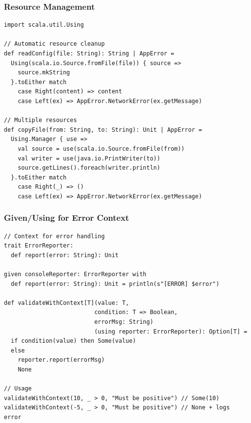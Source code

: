 \documentclass{beamer}
\begin{document}
\begin{frame}[fragile]
\frametitle{Resource Management}

\begin{lstlisting}[style=scalaStyle]
import scala.util.Using

// Automatic resource cleanup
def readConfig(file: String): String | AppError = 
  Using(scala.io.Source.fromFile(file)) { source =>
    source.mkString
  }.toEither match
    case Right(content) => content
    case Left(ex) => AppError.NetworkError(ex.getMessage)

// Multiple resources
def copyFile(from: String, to: String): Unit | AppError = 
  Using.Manager { use =>
    val source = use(scala.io.Source.fromFile(from))
    val writer = use(java.io.PrintWriter(to))
    source.getLines().foreach(writer.println)
  }.toEither match
    case Right(_) => ()
    case Left(ex) => AppError.NetworkError(ex.getMessage)
\end{lstlisting}

\end{frame}

\begin{frame}[fragile]
\frametitle{Given/Using for Error Context}

\begin{lstlisting}[style=scalaStyle]
// Context for error handling
trait ErrorReporter:
  def report(error: String): Unit

given consoleReporter: ErrorReporter with
  def report(error: String): Unit = println(s"[ERROR] $error")

def validateWithContext[T](value: T, 
                          condition: T => Boolean,
                          errorMsg: String)
                          (using reporter: ErrorReporter): Option[T] =
  if condition(value) then Some(value)
  else 
    reporter.report(errorMsg)
    None

// Usage
validateWithContext(10, _ > 0, "Must be positive") // Some(10)
validateWithContext(-5, _ > 0, "Must be positive") // None + logs error
\end{lstlisting}

\end{frame}
\end{document}
